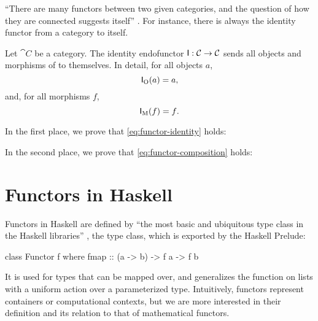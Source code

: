 ``There are many functors between two given categories, and the
question of how they are connected suggests itself''
\parencite[11]{marquis-2013}. For instance, there is always the
identity functor from a category to itself.

\begin{example}
  \label{ex:functor-identity}


  Let $\cat{C}$ be a category. The identity endofunctor $\mathsf{I}:
  \mathcal{C} \to \mathcal{C}$ sends all objects and morphisms of  to
  themselves. In detail, for all objects $a$,
  \begin{equation}
    \label{eq:functor-identity-object}
    \mathsf{I}_{\operatorname{O}}(a) = a
    \text{,}
  \end{equation}
  and, for all morphisms $f$,
  \begin{equation}
    \label{eq:functor-identity-morphism}
    \mathsf{I}_{\operatorname{M}}(f) = f
    \text{.}
  \end{equation}

  In the first place, we prove that \eqref{eq:functor-identity} holds:
  \begin{steps}
      \eqby{\eqref{eq:functor-identity-object}}
  \end{steps}
  In the second place, we prove that \eqref{eq:functor-composition}
  holds:
  \begin{steps}
  \end{steps}

\end{example}

\section{Functors in Haskell}
\label{sec:functors-haskell}

Functors in Haskell are defined by ``the most basic and ubiquitous
type class in the Haskell libraries'' \parencite[18]{yorgey-2009}, the
 type class, which is exported by the Haskell
Prelude:
\begin{codehaskell}
class Functor f where
  fmap :: (a -> b) -> f a -> f b
\end{codehaskell}
It is used for types that can be mapped over, and generalizes the
 function on lists with a uniform action over a
parameterized type. Intuitively, functors represent containers or
computational contexts, but we are more interested in their definition
and its relation to that of mathematical functors.

